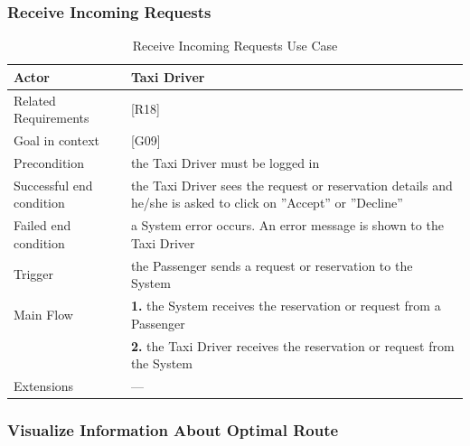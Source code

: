 \subsubsection{Receive Incoming Requests}

\begin{table}[htbp]
\begin{center}
\begin{tabular}[t]{p{}p{}}

\hline
Actor & Taxi Driver \\
\hline
Related Requirements & [R18] \\
\hline
Goal in context & [G09] \\
\hline
Precondition & the Taxi Driver must be logged in \\
\hline
Successful end condition & the Taxi Driver sees the request or reservation details and he/she is asked to click on ''Accept'' or ''Decline'' \\
\hline
Failed end condition & a System error occurs. An error message is shown to the Taxi Driver  \\
\hline
Trigger & the Passenger sends a request or reservation to the System \\
\hline
Main Flow & \textbf{1.} the System receives the reservation or request from a Passenger \\
& \textbf{2.} the Taxi Driver receives the reservation or request from the System \\
\hline
Extensions & --- \\
\hline

\end{tabular}
\end{center}
\caption{Receive Incoming Requests Use Case}
\end{table}
\clearpage

\subsubsection{Visualize Information About Optimal Route}


